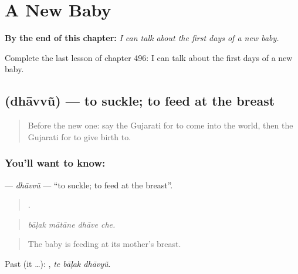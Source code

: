 
\chapter{A New Baby}
\label{ch:gu-a-new-baby}

\begin{chapteropening}
\textbf{By the end of this chapter:} \emph{I can talk about the first days of a new baby.}

Complete the last lesson of chapter 496: I can talk about the first days of a new baby.
\end{chapteropening}

\section[\texorpdfstring{\gu{ધાવવું} (dhāvvũ)}{ધાવવું (dhāvvũ)}]{ (dhāvvũ) — to suckle; to feed at the breast}

\label{lesson:GU-C496-dhavvu}



\begin{quote}
Before the new one: say the Gujarati for to come into the world, then the Gujarati for to give birth to.
\end{quote}

\subsection*{You'll want to know: }
\textbf{} — \emph{dhāvvũ} — \textquotedblleft{}to suckle; to feed at the breast\textquotedblright{}.

\begin{quote}
   .
\end{quote}

\begin{quote}
\emph{bāḷak mātāne dhāve che.}
\end{quote}

\begin{quote}
The baby is feeding at its mother's breast.
\end{quote}

Past (it …):   , \emph{te bāḷak dhāvyũ}.

